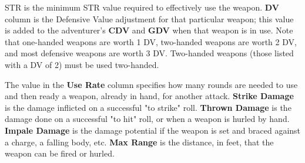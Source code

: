 \begin{multicols*}{2}
STR is the minimum STR value required to effectively use the weapon. \textbf{DV} column is the Defensive Value adjustment for that particular weapon; this value is added to the adventurer's \textbf{CDV} and \textbf{GDV} when that weapon is in use. Note that one-handed weapons are worth 1 DV, two-handed weapons are worth 2 DV, and most defensive weapons are worth 3 DV. Two-handed weapons (those listed with a DV of 2) must be used two-handed.

The value in the \textbf{Use Rate} column specifies how many rounds are needed to use and then ready a weapon, already in hand, for another attack. \textbf{Strike Damage} is the damage inflicted on a successful "to strike" roll. \textbf{Thrown Damage} is the damage done on a successful "to hit" roll, or when a weapon is hurled by hand. \textbf{Impale Damage} is the damage potential if the weapon is set and braced against a charge, a falling body, etc. \textbf{Max Range} is the distance, in feet, that the weapon can be fired or hurled.
\end{multicols*}

\setlength{\columnsep}{\defcolwidth}
